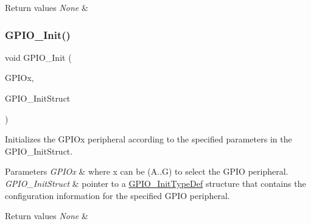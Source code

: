 \begin{DoxyRetVals}{Return values}
{\em None} & \\
\hline
\end{DoxyRetVals}
\mbox{\label{group___g_p_i_o___private___functions_ga71abf9404261370d03cca449b88d3a65}} 
\subsubsection{\texorpdfstring{GPIO\_Init()}{GPIO\_Init()}}
{\footnotesize\ttfamily void G\+P\+I\+O\+\_\+\+Init (\begin{DoxyParamCaption}\item[{\mbox{\hyperlink{struct_g_p_i_o___type_def}{G\+P\+I\+O\+\_\+\+Type\+Def}} $\ast$}]{G\+P\+I\+Ox,  }\item[{\mbox{\hyperlink{struct_g_p_i_o___init_type_def}{G\+P\+I\+O\+\_\+\+Init\+Type\+Def}} $\ast$}]{G\+P\+I\+O\+\_\+\+Init\+Struct }\end{DoxyParamCaption})}



Initializes the G\+P\+I\+Ox peripheral according to the specified parameters in the G\+P\+I\+O\+\_\+\+Init\+Struct. 


\begin{DoxyParams}{Parameters}
{\em G\+P\+I\+Ox} & where x can be (A..G) to select the G\+P\+IO peripheral. \\
\hline
{\em G\+P\+I\+O\+\_\+\+Init\+Struct} & pointer to a \mbox{\hyperlink{struct_g_p_i_o___init_type_def}{G\+P\+I\+O\+\_\+\+Init\+Type\+Def}} structure that contains the configuration information for the specified G\+P\+IO peripheral. \\
\hline
\end{DoxyParams}

\begin{DoxyRetVals}{Return values}
{\em None} & \\
\hline
\end{DoxyRetVals}
\mbox{\label{group___g_p_i_o___private___functions_gad2f2e615928c69fd0d8c641a7cedaafc}} 
